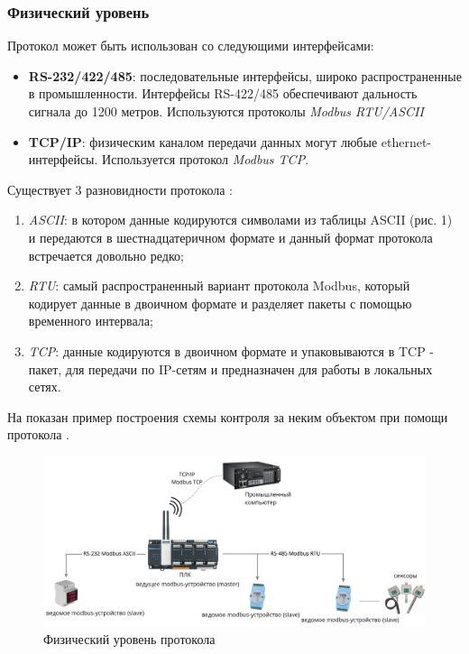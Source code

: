 \documentclass[../AISTR.tex]{subfiles}
\begin{document}
\subsubsection{Физический уровень}
Протокол \mb может быть использован со следующими интерфейсами:
\begin{itemize}
	\item \textbf{RS-232/422/485}:  последовательные интерфейсы, широко распространенные в промышленности. Интерфейсы RS-422/485 обеспечивают дальность сигнала до 1200 метров. Используются протоколы \textit{Modbus RTU/ASCII}
	\item \textbf{TCP/IP}: физическим каналом передачи данных могут любые ethernet-ин\-терфейсы. Используется протокол \textit{Modbus TCP}.
\end{itemize}
Существует 3 разновидности протокола \mb{} \cite{_modbus_2021}:
\begin{enumerate}
	\item \mb{} \textit{ASCII}: в котором данные кодируются символами из таблицы ASCII (рис. 1) и передаются в шестнадцатеричном формате и данный формат протокола встречается довольно редко;
	\item \mb{} \textit{RTU}: самый распространенный вариант протокола Modbus, который кодирует данные в двоичном формате и разделяет пакеты с помощью временного интервала;
	\item \mb{} \textit{TCP}:  данные кодируются в двоичном формате и упаковываются в TCP - пакет, для передачи по IP-сетям и предназначен для работы в локальных сетях.
\end{enumerate}

На  показан пример построения схемы контроля за неким объектом при помощи протокола \mb{} \cite{advantech_iot__2019}.

\begin{figure}
	\centering
	\includegraphics[width=\linewidth]{../images/modbus_phys}
	\caption{Физический уровень протокола \mb{}}
	\label{fig:modbusphys}
\end{figure}
\end{document}
